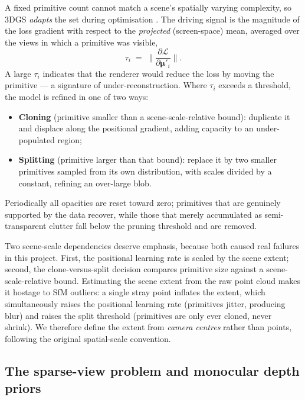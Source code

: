 A fixed primitive count cannot match a scene's spatially varying complexity, so
3DGS \emph{adapts} the set during optimisation \cite{kerbl2023gaussian}. The
driving signal is the magnitude of the loss gradient with respect to the
\emph{projected} (screen-space) mean, averaged over the views in which a primitive
was visible,
\begin{equation}
  \tau_i \;=\; \Big\lVert \frac{\partial \mathcal{L}}{\partial \bm{\mu}'_i}\Big\rVert.
\end{equation}
A large $\tau_i$ indicates that the renderer would reduce the loss by moving the
primitive --- a signature of under-reconstruction. Where $\tau_i$ exceeds a
threshold, the model is refined in one of two ways:
\begin{itemize}
  \item \textbf{Cloning} (primitive smaller than a scene-scale-relative bound):
        duplicate it and displace along the positional gradient, adding capacity
        to an under-populated region;
  \item \textbf{Splitting} (primitive larger than that bound): replace it by two
        smaller primitives sampled from its own distribution, with scales divided
        by a constant, refining an over-large blob.
\end{itemize}
Periodically all opacities are reset toward zero; primitives that are genuinely
supported by the data recover, while those that merely accumulated as
semi-transparent clutter fall below the pruning threshold and are removed.

Two scene-scale dependencies deserve emphasis, because both caused real failures
in this project. First, the positional learning rate is scaled by the scene
extent; second, the clone-versus-split decision compares primitive size against a
scene-scale-relative bound. Estimating the scene extent from the raw point cloud
makes it hostage to SfM outliers: a single stray point inflates the extent, which
simultaneously raises the positional learning rate (primitives jitter, producing
blur) and raises the split threshold (primitives are only ever cloned, never
shrink). We therefore define the extent from \emph{camera centres} rather than
points, following the original spatial-scale convention.

\subsection{The sparse-view problem and monocular depth priors}
\label{sec:sparse}

